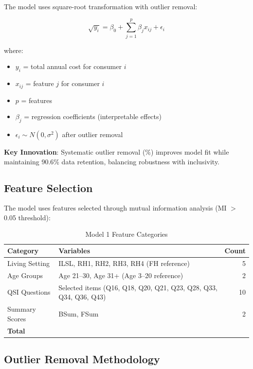 The model uses square-root transformation with outlier removal:

\begin{equation}
\sqrt{y_i} = \beta_0 + \sum_{j=1}^{p} \beta_j x_{ij} + \epsilon_i
\end{equation}

where:
\begin{itemize}
    \item $y_i$ = total annual cost for consumer $i$
    \item $x_{ij}$ = feature $j$ for consumer $i$
    \item $p$ = \ModelOneNumFeatures{} features
    \item $\beta_j$ = regression coefficients (interpretable effects)
    \item $\epsilon_i \sim N(0, \sigma^2)$ after outlier removal
\end{itemize}

\textbf{Key Innovation}: Systematic outlier removal (\ModelOneOutlierPercentage{}\%) improves model fit while maintaining 90.6\% data retention, balancing robustness with inclusivity.

\subsection{Feature Selection}

The model uses \ModelOneNumFeatures{} features selected through mutual information analysis (MI $>$ 0.05 threshold):

\begin{table}[h]
\centering
\caption{Model 1 Feature Categories}
\begin{tabular}{llr}
\toprule
\textbf{Category} & \textbf{Variables} & \textbf{Count} \\
\midrule
Living Setting & ILSL, RH1, RH2, RH3, RH4 (FH reference) & 5 \\
Age Groups & Age 21--30, Age 31+ (Age 3--20 reference) & 2 \\
QSI Questions & Selected items (Q16, Q18, Q20, Q21, Q23, Q28, Q33, Q34, Q36, Q43) & 10 \\
Summary Scores & BSum, FSum & 2 \\
\midrule
\textbf{Total} & & \ModelOneNumFeatures{} \\
\bottomrule
\end{tabular}
\end{table}

\subsection{Outlier Removal Methodology}

